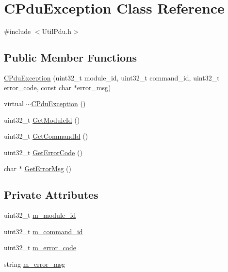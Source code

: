 \hypertarget{class_c_pdu_exception}{}\section{C\+Pdu\+Exception Class Reference}
\label{class_c_pdu_exception}


{\ttfamily \#include $<$Util\+Pdu.\+h$>$}

\subsection*{Public Member Functions}
\begin{DoxyCompactItemize}
\item 
\hyperlink{class_c_pdu_exception_a755149ac96f14a0a94d8ade20e4e6595}{C\+Pdu\+Exception} (uint32\+\_\+t module\+\_\+id, uint32\+\_\+t command\+\_\+id, uint32\+\_\+t error\+\_\+code, const char $\ast$error\+\_\+msg)
\item 
virtual \hyperlink{class_c_pdu_exception_a17065b22f23e08304d6c27d545cf7c84}{$\sim$\+C\+Pdu\+Exception} ()
\item 
uint32\+\_\+t \hyperlink{class_c_pdu_exception_a0318d8fb854003d45c3781415d05599a}{Get\+Module\+Id} ()
\item 
uint32\+\_\+t \hyperlink{class_c_pdu_exception_a00309554421b3252fc01eb159c89d437}{Get\+Command\+Id} ()
\item 
uint32\+\_\+t \hyperlink{class_c_pdu_exception_a3b64a410655974f70dc4d04d8dbe2b20}{Get\+Error\+Code} ()
\item 
char $\ast$ \hyperlink{class_c_pdu_exception_a68305c00b333fcfee876bd547e60ffcd}{Get\+Error\+Msg} ()
\end{DoxyCompactItemize}
\subsection*{Private Attributes}
\begin{DoxyCompactItemize}
\item 
uint32\+\_\+t \hyperlink{class_c_pdu_exception_a25c775cee77bbb9b3af47c98421c536b}{m\+\_\+module\+\_\+id}
\item 
uint32\+\_\+t \hyperlink{class_c_pdu_exception_a5a11d340b24eff20084f78eb632b02d0}{m\+\_\+command\+\_\+id}
\item 
uint32\+\_\+t \hyperlink{class_c_pdu_exception_af61943fb70c9b0e2d6573a924152a907}{m\+\_\+error\+\_\+code}
\item 
string \hyperlink{class_c_pdu_exception_a7827c42132bad96adfef04d9c8c300fb}{m\+\_\+error\+\_\+msg}
\end{DoxyCompactItemize}


